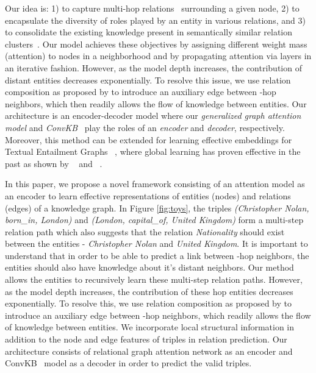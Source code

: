 \documentclass[11pt,a4paper]{article}
\begin{document}
Our idea is: 1) to capture multi-hop relations~\cite{Lin2015} surrounding a given node, 2) to encapsulate the diversity of roles played by an entity in various relations, and 3) to consolidate the existing knowledge present in semantically similar relation clusters~\cite{Valverde_2012}. 
Our model achieves these objectives by assigning different weight mass (attention) to nodes in a neighborhood and by propagating attention via layers in an iterative fashion. However, as the model depth increases, the contribution of distant entities decreases exponentially. To resolve this issue, we use relation composition as proposed by \cite{Lin2015} to introduce an auxiliary edge between -hop neighbors, which then readily allows the flow of knowledge between entities. 
Our architecture is an encoder-decoder model where our \emph{generalized graph attention model} and \emph{ConvKB}~\cite{nguyen2018novel} play the roles of an \emph{encoder} and \emph{decoder}, respectively. Moreover, this method can be extended for learning effective embeddings for Textual Entailment Graphs ~\cite{kotlerman_dagan_magnini_bentivogli_2015}, where global learning has proven effective in the past as shown by ~\cite{berant-etal-2015-efficient} and ~\cite{berant-etal-2010-global}.



In this paper, we propose a novel framework consisting of an attention model as an encoder to learn effective representations of entities (nodes) and relations (edges) of a knowledge graph. In Figure \ref{fig:toys}, the triples \textit{(Christopher Nolan, born\_in, London)} and \textit{(London, capital\_of, United Kingdom)} form a multi-step relation path which also suggests that the relation \textit{Nationality} should exist between the entities - \textit{Christopher Nolan} and \textit{United Kingdom}. It is important to understand that in order to be able to predict a link between -hop neighbors, the entities should also have knowledge about it’s distant neighbors. Our method allows the entities to recursively learn these multi-step relation paths. However, as the model depth increases, the contribution of these  hop entities decreases exponentially. To resolve this, we use relation composition as proposed by \cite{Lin2015} to introduce an auxiliary edge between -hop neighbors, which readily allows the flow of knowledge between entities. We incorporate local structural information in addition to the node and edge features of triples in relation prediction. Our architecture consists of relational graph attention network as an encoder and ConvKB~\cite{nguyen2018novel} model as a decoder in order to predict the valid triples.
\fi
\end{document}
